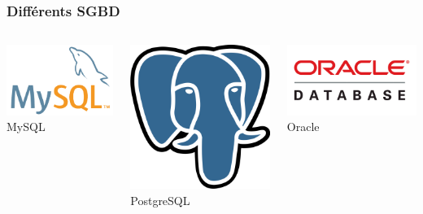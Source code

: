 \begin{frame}
  \frametitle{Différents SGBD}

  \begin{columns}[T,onlytextwidth]
      \includegraphics[width=0.8\linewidth]{mysql-logo.png} \\
      MySQL

      \includegraphics[width=0.8\linewidth]{pg.png} \\
      PostgreSQL

      \includegraphics[width=0.8\linewidth]{oracle-database-logo.png} \\
      Oracle


\end{columns}
\end{frame}
